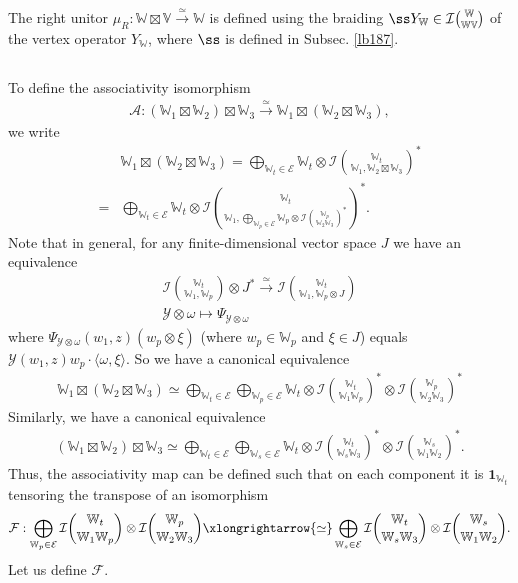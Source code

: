 \documentclass[11pt,b5paper,notitlepage]{article}
\theoremstyle{definition}
\theoremstyle{plain}
\newcommand{\mc}{\mathcal}
\newcommand{\id}{\mathbf{1}}
\newcommand{\bk}[1]{\langle {#1}\rangle}
\newcommand{\Vbb}{\mathbb V}
\newcommand{\Wbb}{\mathbb W}
\numberwithin{equation}{section}
\begin{document}
The right unitor $\mu_R:\Wbb\boxtimes\Vbb\xrightarrow{\simeq}\Wbb$ is defined using the braiding $\ss Y_\Wbb\in\mc I{\Wbb\choose\Wbb\Vbb}$ of the vertex operator $Y_\Wbb$, where $\ss$ is defined in Subsec. \ref{lb187}.

\subsection{}

To define the associativity isomorphism
\begin{align*}
\mc A:(\Wbb_1\boxtimes\Wbb_2)\boxtimes\Wbb_3\xrightarrow{\simeq}\Wbb_1\boxtimes(\Wbb_2\boxtimes\Wbb_3),
\end{align*}
we write
\begin{align*}
&\Wbb_1\boxtimes(\Wbb_2\boxtimes\Wbb_3)=\bigoplus_{\Wbb_t\in\mc E}\Wbb_t\otimes\mc I{\Wbb_t\choose \Wbb_1,\Wbb_2\boxtimes\Wbb_3}^*\\
=&\bigoplus_{\Wbb_t\in\mc E}\Wbb_t\otimes\mc I{\Wbb_t\choose \Wbb_1,\bigoplus_{\Wbb_p\in\mc E}\Wbb_p\otimes\mc I{\Wbb_p\choose\Wbb_2\Wbb_3}^*}^*.
\end{align*}
Note that in general, for any finite-dimensional vector space $J$ we have an equivalence
\begin{gather*}
\mc I{\Wbb_t\choose \Wbb_1,\Wbb_p}\otimes J^*\xrightarrow{\simeq}\mc I{\Wbb_t\choose \Wbb_1,\Wbb_p\otimes J}\\
\mc Y\otimes\omega\mapsto \Psi_{\mc Y\otimes\omega}
\end{gather*}
where $\Psi_{\mc Y\otimes\omega}(w_1,z)(w_p\otimes \xi)$ (where $w_p\in\Wbb_p$ and $\xi\in J$) equals $\mc Y(w_1,z)w_p\cdot \bk{\omega,\xi}$. So we have a canonical equivalence
\begin{align}
\Wbb_1\boxtimes(\Wbb_2\boxtimes\Wbb_3)\simeq \bigoplus_{\Wbb_t\in\mc E}\bigoplus_{\Wbb_p\in\mc E}\Wbb_t\otimes \mc I{\Wbb_t\choose \Wbb_1\Wbb_p}^*\otimes \mc I{\Wbb_p\choose\Wbb_2\Wbb_3}^*
\end{align}
Similarly, we have a canonical equivalence
\begin{align}
(\Wbb_1\boxtimes\Wbb_2)\boxtimes\Wbb_3\simeq\bigoplus_{\Wbb_t\in\mc E}\bigoplus_{\Wbb_s\in\mc E}\Wbb_t\otimes\mc I{\Wbb_t\choose \Wbb_s\Wbb_3}^*\otimes\mc I{\Wbb_s\choose \Wbb_1\Wbb_2}^*.
\end{align}
Thus, the associativity map can be defined such that on each component it is  $\id_{\Wbb_t}$ tensoring the transpose of an  isomorphism
\begin{align}
\mc F:\bigoplus_{\Wbb_p\in\mc E}\mc I{\Wbb_t\choose \Wbb_1\Wbb_p}\otimes \mc I{\Wbb_p\choose\Wbb_2\Wbb_3}\xlongrightarrow{\simeq}\bigoplus_{\Wbb_s\in\mc E}\mc I{\Wbb_t\choose \Wbb_s\Wbb_3}\otimes\mc I{\Wbb_s\choose \Wbb_1\Wbb_2}.\label{eq260}
\end{align}
Let us define $\mc F$.
\end{document}
